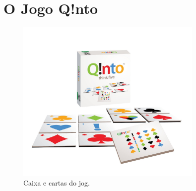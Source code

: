 \documentclass[a4paper]{article}
\begin{document}

\newpage

%
%
%
%
%
%
%


\section{O Jogo Q!nto}

\begin{figure}[ht!]
\centering
\includegraphics[width=90mm]{q!ntologo.jpg}
\caption{Caixa e cartas do jog. \label{q!nto}}
\end{figure}
\end{document}
